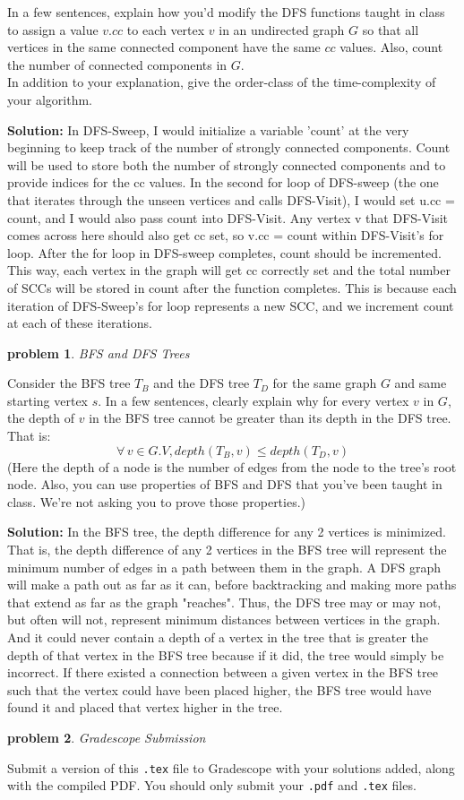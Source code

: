 \documentclass[10pt]{article}
\newcommand{\solution}[1]{\color{blue}\hfill\break\noindent\textbf{Solution:} #1\color{black}}
\newtheorem{problem}{\sc\color{cit}problem}
\begin{document}
In a few sentences, explain how you'd modify the DFS functions taught in class to assign a value $v.cc$ to each vertex $v$ in an undirected graph $G$ so that all vertices in the same connected component have the same $cc$ values.  Also, count the number of connected components in $G$. \\
In addition to your explanation, give the order-class of the time-complexity of your algorithm.

\solution{
    In DFS-Sweep, I would initialize a variable 'count' at the very beginning to keep track of the number of strongly connected components. Count will be used to store both the number of strongly connected components and to provide indices for the cc values. In the second for loop of DFS-sweep (the one that iterates through the unseen vertices and calls DFS-Visit), I would set u.cc = count, and I would also pass count into DFS-Visit. Any vertex v that DFS-Visit comes across here should also get cc set, so v.cc = count within DFS-Visit's for loop. After the for loop in DFS-sweep completes, count should be incremented. This way, each vertex in the graph will get cc correctly set and the total number of SCCs will be stored in count after the function completes. This is because each iteration of DFS-Sweep's for loop represents a new SCC, and we increment count at each of these iterations.
}
\pagebreak

\begin{problem} BFS and DFS Trees \end{problem}

Consider the BFS tree $T_B$ and the DFS tree $T_D$ for the same graph $G$ and same starting vertex $s$.
In a few sentences, clearly explain why for every vertex $v$ in $G$, the depth of $v$ in the BFS tree cannot be greater than its depth in the DFS tree. That is:
$$ \forall \, v \in G.V, depth(T_B, v) \leq depth(T_D, v)$$
(Here the depth of a node is the number of edges from the node to the tree's root node. Also, you can use properties of BFS and DFS that you've been taught in class. We're not asking you to prove those properties.)

\solution{
    In the BFS tree, the depth difference for any 2 vertices is minimized. That is, the depth difference of any 2 vertices in the BFS tree will represent the minimum number of edges in a path between them in the graph. A DFS graph will make a path out as far as it can, before backtracking and making more paths that extend as far as the graph "reaches". Thus, the DFS tree may or may not, but often will not, represent minimum distances between vertices in the graph. And it could never contain a depth of a vertex in the tree that is greater the depth of that vertex in the BFS tree because if it did, the tree would simply be incorrect. If there existed a connection between a given vertex in the BFS tree such that the vertex could have been placed higher, the BFS tree would have found it and placed that vertex higher in the tree.
}


\begin{problem} Gradescope Submission \end{problem}
Submit a version of this \verb|.tex| file to Gradescope with your solutions added, along with the compiled PDF.  You should only submit your \verb|.pdf| and \verb|.tex| files.
\end{document}
